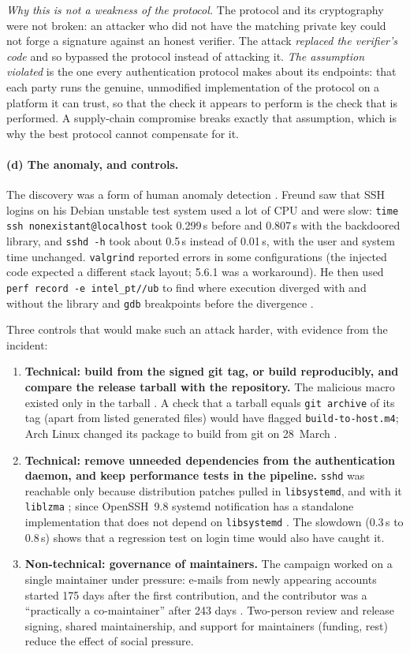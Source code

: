 \documentclass[11pt,a4paper]{article}
\newcommand{\code}[1]{\texttt{#1}}
\begin{document}
\emph{Why this is not a weakness of the protocol.} The protocol and its cryptography were not broken: an attacker who did not
have the matching private key could not forge a signature against an honest verifier. The attack \emph{replaced the verifier's code}
and so bypassed the protocol instead of attacking it. \emph{The assumption violated} is the one every authentication protocol
makes about its endpoints: that each party runs the genuine, unmodified implementation of the protocol on a platform it can
trust, so that the check it appears to perform is the check that is performed. A supply-chain compromise breaks exactly that
assumption, which is why the best protocol cannot compensate for it.

\paragraph{(d) The anomaly, and controls.} The discovery was a form of human anomaly detection \cite{freund}. Freund saw that SSH
logins on his Debian unstable test system used a lot of CPU and were slow: \code{time ssh nonexistant@localhost} took 0.299\,s
before and 0.807\,s with the backdoored library, and \code{sshd -h} took about 0.5\,s instead of 0.01\,s, with the user and system
time unchanged. \code{valgrind} reported errors in some configurations (the injected code expected a different stack layout; 5.6.1 was a
workaround). He then used \code{perf record -e intel\_pt//ub} to find where execution diverged with and without the library and
\code{gdb} breakpoints before the divergence \cite{freund}.

Three controls that would make such an attack harder, with evidence from the incident:
\begin{enumerate}[label=(\arabic*)]
\item \textbf{Technical: build from the signed git tag, or build reproducibly, and compare the release tarball with the repository.}
The malicious macro existed only in the tarball \cite{freund}. A check that a tarball equals \code{git archive} of its tag (apart
from listed generated files) would have flagged \code{build-to-host.m4}; Arch Linux changed its package to build from git on
28~March \cite{cox}.
\item \textbf{Technical: remove unneeded dependencies from the authentication daemon, and keep performance tests in the pipeline.}
\code{sshd} was reachable only because distribution patches pulled in \code{libsystemd}, and with it \code{liblzma}
\cite{freund}; since OpenSSH~9.8 systemd notification has a standalone implementation that does not depend on \code{libsystemd}
\cite{openssh98}. The slowdown (0.3\,s to 0.8\,s)
shows that a regression test on login time would also have caught it.
\item \textbf{Non-technical: governance of maintainers.} The campaign worked on a single maintainer under pressure: e-mails
from newly appearing accounts started 175 days after the first contribution, and the contributor was a ``practically a
co-maintainer'' after 243 days \cite{cox}. Two-person review and release signing, shared maintainership, and support for
maintainers (funding, rest) reduce the effect of social pressure.
\end{enumerate}
\end{document}
